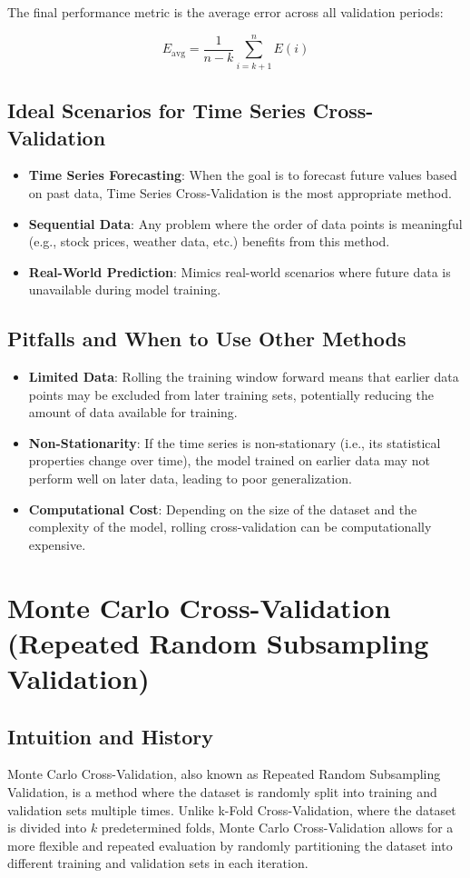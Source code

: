 \documentclass[10pt]{article}
\begin{document}
The final performance metric is the average error across all validation periods:

\[
E_{\text{avg}} = \frac{1}{n - k} \sum_{i = k+1}^{n} E(i)
\]

\subsection{Ideal Scenarios for Time Series Cross-Validation}
\begin{itemize}
    \item \textbf{Time Series Forecasting}: When the goal is to forecast future values based on past data, Time Series Cross-Validation is the most appropriate method.
    \item \textbf{Sequential Data}: Any problem where the order of data points is meaningful (e.g., stock prices, weather data, etc.) benefits from this method.
    \item \textbf{Real-World Prediction}: Mimics real-world scenarios where future data is unavailable during model training.
\end{itemize}

\subsection{Pitfalls and When to Use Other Methods}
\begin{itemize}
    \item \textbf{Limited Data}: Rolling the training window forward means that earlier data points may be excluded from later training sets, potentially reducing the amount of data available for training.
    \item \textbf{Non-Stationarity}: If the time series is non-stationary (i.e., its statistical properties change over time), the model trained on earlier data may not perform well on later data, leading to poor generalization.
    \item \textbf{Computational Cost}: Depending on the size of the dataset and the complexity of the model, rolling cross-validation can be computationally expensive.
\end{itemize}

\section{Monte Carlo Cross-Validation (Repeated Random Subsampling Validation)}
\subsection{Intuition and History}
Monte Carlo Cross-Validation, also known as Repeated Random Subsampling Validation, is a method where the dataset is randomly split into training and validation sets multiple times. Unlike k-Fold Cross-Validation, where the dataset is divided into \(k\) predetermined folds, Monte Carlo Cross-Validation allows for a more flexible and repeated evaluation by randomly partitioning the dataset into different training and validation sets in each iteration.
\end{document}
